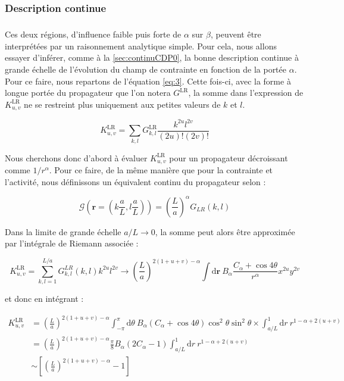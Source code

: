 \subsubsection{Description continue}

\subparagraph{}Ces deux régions, d'influence faible puis forte de $\alpha$ sur $\beta$, peuvent être interprétées par un raisonnement analytique simple. Pour cela, nous allons essayer d'inférer, comme à la \autoref{sec:continuCDP0}, la bonne description continue à grande échelle de l'évolution du champ de contrainte en fonction de la portée $\alpha$. Pour ce faire, nous repartons de l'équation \autoref{eq:3}. Cette fois-ci, avec la forme à longue portée du propagateur que l'on notera $G^\text{LR}$, la somme dans l'expression de $K^\text{LR}_{u,v}$ ne se restreint plus uniquement aux petites valeurs de $k$ et $l$. 

\begin{equation}
	K^\text{LR}_{u,v} = \sum_{k,l}G^\text{LR}_{k,l}\frac{k^{2u}l^{2v}}{(2u)!(2v)!}
	\label{eq:sommekuv}
\end{equation}

Nous cherchons donc d'abord à évaluer $K^\text{LR}_{u,v}$ pour un propagateur décroissant comme $1/r^\alpha$. Pour ce faire, de la même manière que pour la contrainte et l'activité, nous définissons un équivalent continu du propagateur selon :

\begin{equation}
    \mathcal{G}\left(\mathbf{r}=(k\frac{a}{L},l\frac{a}{L})\right) = \left(\frac{L}{a}\right)^\alpha G_{LR}(k,l)
    \label{eq:rescaled:propagator}
\end{equation}

\noindent Dans la limite de grande échelle $a/L \rightarrow 0$, la somme peut  alors être approximée par l'intégrale de Riemann associée :

\begin{equation}
    K^\text{LR}_{u,v} = \sum_{k,l = 1}^{L/a}G_{k,l}^{LR}(k,l)k^{2u}l^{2v}
    \rightarrow \left(\frac{L}{a}\right)^{2(1+u+v)-\alpha}\int \mathrm{d}\mathbf{r}~B_\alpha\frac{C_\alpha+\cos 4\theta}{r^\alpha}x^{2u}y^{2v}
\end{equation}

\noindent et donc en intégrant :

\begin{equation}
\begin{aligned}
    K^\text{LR}_{u,v} &= \left(\frac{L}{a}\right)^{2(1+u+v)-\alpha}\int_{-\pi}^\pi \mathrm{d}\theta~B_\alpha(C_\alpha+\cos 4\theta)\cos^2\theta\sin^2\theta
    \times \int_{a/L}^1 \mathrm{d}r ~ r^{1-\alpha+2(u+v)}\\
    &=\left(\frac{L}{a}\right)^{2(1+u+v)-\alpha}\frac{\pi}{8}B_\alpha(2C_\alpha-1)\int_{a/L}^1 \mathrm{d}r ~ r^{1-\alpha+2(u+v)}\\
    &\sim \left[ \left(\frac{L}{a}\right)^{2(1+u+v)-\alpha}-1 \right]
    \label{eq:eval:I}
\end{aligned}
\end{equation}

